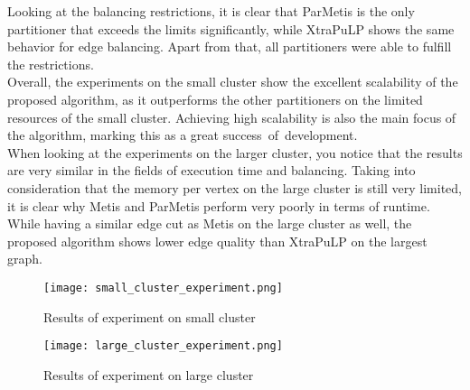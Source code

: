 \documentclass[acmsmall,nonacm,screen,review]{acmart}
\begin{document}
Looking at the balancing restrictions, it is clear that ParMetis is the only partitioner that exceeds the limits significantly, while XtraPuLP shows the same behavior for edge balancing. Apart from that, all partitioners were able to fulfill the restrictions. \\
Overall, the experiments on the small cluster show the excellent scalability of the proposed algorithm, as it outperforms the other partitioners on the limited resources of the small cluster. Achieving high scalability is also the main focus of the algorithm, marking this as a great \hbox{success of development.} \\
When looking at the experiments on the larger cluster, you notice that the results are very similar in the fields of execution time and balancing. Taking into consideration that the memory per vertex on the large cluster is still very limited, it is clear why Metis and ParMetis perform very poorly in terms of runtime. While having a similar edge cut as Metis on the large cluster as well, the proposed algorithm shows lower edge quality than XtraPuLP on the largest graph.
\begin{figure}[t]
\centering
\caption{Results of experiment on small cluster}
\label{small_ex}
\texttt{[image: small\_cluster\_experiment.png]}
\end{figure}
\begin{figure}[t]
\centering
\caption{Results of experiment on large cluster}
\label{large_ex}
\texttt{[image: large\_cluster\_experiment.png]}
\end{figure}
\end{document}

